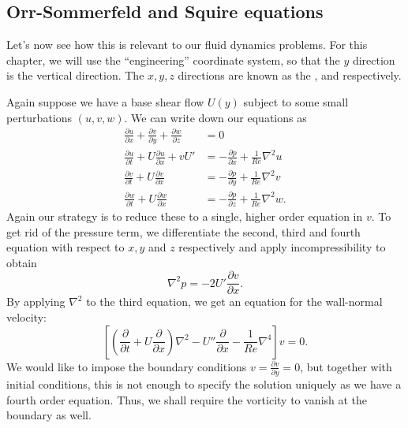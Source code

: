 \documentclass[a4paper]{article}
\begin{document}
\subsection{Orr-Sommerfeld and Squire equations}
Let's now see how this is relevant to our fluid dynamics problems. For this chapter, we will use the ``engineering'' coordinate system, so that the $y$ direction is the vertical direction. The $x, y, z$ directions are known as the ,  and  respectively.
\begin{center}
\end{center}
Again suppose we have a base shear flow $U(y)$ subject to some small perturbations $(u, v, w)$. We can write down our equations as
\begin{align*}
  \frac{\partial u}{\partial x} + \frac{\partial v}{\partial y} + \frac{\partial w}{\partial z} &= 0\\
  \frac{\partial u}{\partial t} + U \frac{\partial u}{\partial x} + v U' &= - \frac{\partial p}{\partial x} + \frac{1}{Re}\nabla^2 u\\
  \frac{\partial v}{\partial t} + U \frac{\partial v}{\partial x} &= - \frac{\partial p}{\partial y} + \frac{1}{Re} \nabla^2 v\\
  \frac{\partial w}{\partial t} + U \frac{\partial w}{\partial x} &= - \frac{\partial p}{\partial z} + \frac{1}{Re} \nabla^2 w.
\end{align*}
Again our strategy is to reduce these to a single, higher order equation in $v$. To get rid of the pressure term, we differentiate the second, third and fourth equation with respect to $x, y$ and $z$ respectively and apply incompressibility to obtain
\[
  \nabla^2 p = -2U' \frac{\partial v}{\partial x}.
\]
By applying $\nabla^2$ to the third equation, we get an equation for the wall-normal velocity:
\[
  \left[ \left(\frac{\partial}{\partial t} + U \frac{\partial}{\partial x}\right)\nabla^2 - U'' \frac{\partial}{\partial x} - \frac{1}{Re}\nabla^4\right] v = 0.
\]
We would like to impose the boundary conditions $v = \frac{\partial v}{\partial y} = 0$, but together with initial conditions, this is not enough to specify the solution uniquely as we have a fourth order equation. Thus, we shall require the vorticity to vanish at the boundary as well.
\end{document}
